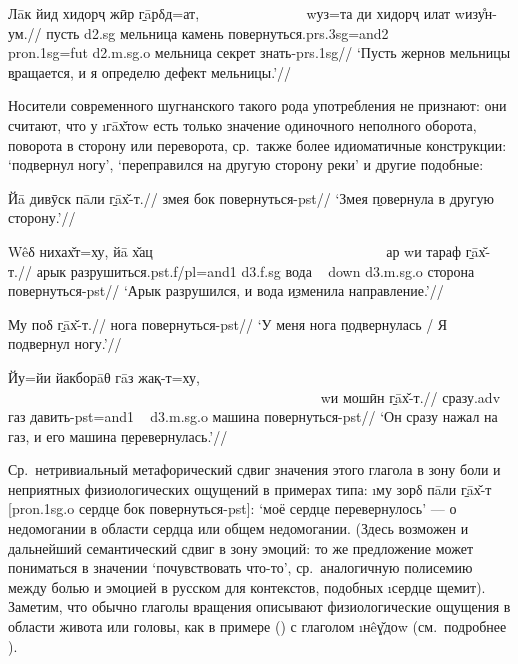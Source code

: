 \begingl
\gla Лāк йид хидорҷ жӣр \b{гāрδд}=ат, ~~~~~~~~~~~~~~ wуз=та ди хидорҷ илат wизу̊н-ум.//
\glc пусть {\sc d2.sg} мельница камень повернуться.{\sc prs.3sg=and2} ~~~~~~~~~~~~~~ {\sc pron.1sg=fut} {\sc d2.m.sg.o} мельница секрет знать-{\sc prs.1sg}//
\glft ‘Пусть жернов мельницы \b{вращается}, и я определю дефект мельницы.’//
\endgl \xe

Носители современного шугнанского такого рода употребления не признают: они считают, что у \i{гāх̌тоw} есть только значение одиночного неполного оборота, поворота в сторону или переворота, ср.~также более идиоматичные конструкции: ‘подвернул ногу’, ‘переправился на другую сторону реки’ и другие подобные:

\begingl
\gla Йā дивӯск пāли \b{гāх̌-т}.//
 змея бок повернуться-{\sc pst}//
\glft ‘Змея \b{повернула} в другую сторону.’//
\endgl \xe

\begingl
\gla Wêδ нихах̌т=ху, йā х̌ац ~~~~~~~~~~~~~~~~~~~~~~~~~~~~~~~~ ар wи тараф \b{гāх̌-т}.//
\glc арык разрушиться.{\sc pst.f/pl=and1} {\sc d3.f.sg} вода ~ {\sc down} {\sc d3.m.sg.o} сторона повернуться-{\sc pst}//
\glft ‘Арык разрушился, и вода \b{изменила направление}.’//
\endgl \xe

\begingl
\gla Му поδ \b{гāх̌-т}.//
 нога повернуться-{\sc pst}//
\glft ‘У меня нога \b{подвернулась} / Я подвернул ногу.’//
\endgl \xe

\begingl
\gla Йу=йи йакборāθ гāз жақ-т=ху, ~~~~~~~~~~~~~~~~~~~~~~~~~~~~~~~~~~~~~~~~~~~~ wи мошӣн \b{гāх̌-т}.//
 сразу.{\sc adv} газ давить-{\sc pst=and1} ~ {\sc d3.m.sg.o} машина повернуться-{\sc pst}//
\glft ‘Он сразу нажал на газ, и его машина \b{перевернулась}.’//
\endgl \xe

Ср.~нетривиальный метафорический сдвиг значения этого глагола в зону боли и неприятных физиологических ощущений в примерах типа: \i{му зорδ пāли \b{гāх̌-т}} [{\sc pron.1sg.o} сердце бок повернуться-{\sc pst}]: ‘моё сердце перевернулось’ — о недомогании в области сердца или общем недомогании. (Здесь возможен и дальнейший семантический сдвиг в зону эмоций: то же предложение может пониматься в значении ‘почувствовать что-то’, ср.~аналогичную полисемию между болью и эмоцией в русском для контекстов, подобных \i{сердце щемит}). Заметим, что обычно глаголы вращения описывают физиологические ощущения в области живота или головы, как в примере () с глаголом \i{нêɣ̌доw} (см.~подробнее \parencite{reznikova_etal2012}).

